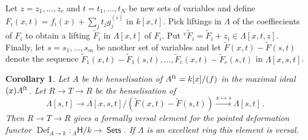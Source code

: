 \documentclass[a4paper,10pt]{amsart}
\theoremstyle{plain}
\newtheorem{cor}[xx]{Corollary}%
\theoremstyle{definition}
\theoremstyle{remark}
\numberwithin{equation}{xx}
\DeclareMathOperator{\Def}{Def}
\DeclareMathOperator{\Sets}{\cat{Sets}}
\newcommand{\co}{\colon}
\newcommand{\ra}{\rightarrow}
\newcommand{\vL}{\varLambda}
\newcommand{\cat}[1]{\mathsf{{#1}}}
\newcommand{\df}[2]{{\Def}_{#2}^{#1}}
\newcommand{\xra}[1]{\xrightarrow{{#1}}}
\begin{document}
Let \(z=z_{1},\dots,z_{c}\) and \(t=t_{1},\dots,t_{N}\) be new sets of variables and define \(F_{i}(x,t)=f_{i}(x)+\sum_{j} t_{j}g_{j}^{(i)}\) in \(k[x,t]\). 
Pick liftings in \(\vL\) of the coeffiecients of \(F_{i}\) to obtain a lifting \(\tilde{F}_{i}\) in \(\vL[x,t]\) of \(F_{i}\). Put \({}^{v\!}\tilde{F}_{i}=\tilde{F}_{i}+z_{i}\in\vL[x,t,z]\). Finally, let \(s=s_{1},\dots,s_{m}\) be another set of variables and let \(\tilde{F}(x,t)-\tilde{F}(s,t)\) denote the sequence \(\tilde{F}_{1}(x,t)-\tilde{F}_{1}(s,t),\dots,\tilde{F}_{c}(x,t)-\tilde{F}_{c}(s,t)\) in \(\vL[x,s,t]\).
\begin{cor}\label{cor.main2}
Let \(A\) be the henselisation of \(A^{\textnormal{ft}}=k[x]/(f)\) in the maximal ideal \((x)A^{\textnormal{ft}}\)\textup{.} Let \(R\ra T\ra R\) be the henselisation of 
\begin{equation*}
\vL[s,t]\ra\vL[x,s,t]/(\tilde{F}(x,t)-\tilde{F}(s,t))\xra{x\mapsto s} \vL[s,t]\,.
\end{equation*}
Then \(R\ra T\ra R\) gives a formally versal element for the pointed deformation functor \(\df{}{A\ra k}\co {}_{\vL}\cat{H}/k\ra \Sets\)\textup{.} If  \(\vL\) is an excellent ring this element is versal\textup{.}
\end{cor}
\end{document}
